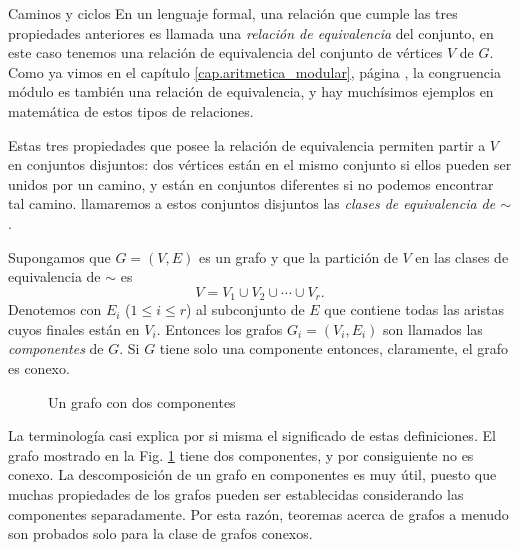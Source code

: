 \begin{section}{Caminos y ciclos}
En un lenguaje formal, una relación que  cumple las tres propiedades anteriores es llamada una  \textit{relación de equivalencia} del conjunto, en este caso tenemos una relación de equivalencia del conjunto de vértices $V$ de $G$. Como ya vimos en el capítulo \ref{cap.aritmetica_modular}, página  \pageref{relacion-de-equivalencia}, la congruencia módulo es también una relación de equivalencia, y hay muchísimos ejemplos en matemática de estos tipos de relaciones. 

Estas tres propiedades que posee la relación de equivalencia permiten partir a $V$ en conjuntos disjuntos: dos vértices están en el mismo conjunto si ellos pueden ser unidos por un camino, y están en conjuntos diferentes si no podemos encontrar tal camino. llamaremos a estos conjuntos disjuntos las \textit{clases de equivalencia de $\sim$}.

\begin{definicion}Supongamos que $G=(V,E)$ es un grafo y que la partición de $V$ en las clases de equivalencia de $\sim$ es
$$
V= V_1 \cup V_2 \cup \cdots \cup V_r.
$$
Denotemos con $E_i$ ($1\le i \le r$) al subconjunto de $E$ que contiene todas las aristas cuyos finales están en $V_i$. Entonces los grafos $G_i=(V_i,E_i)$ son llamados las \textit{componentes}     de $G$. Si $G$ tiene solo una componente entonces, claramente, el grafo es {conexo}.
\end{definicion}

\begin{figure}[t]
    \begin{center}
\end{center}
\caption{Un grafo con dos componentes} \label{f5.6}
\end{figure}

La terminología casi explica por si misma el significado de estas definiciones. El grafo mostrado en la Fig. \ref{f5.6} tiene dos componentes, y por consiguiente no es conexo. La descomposición de un grafo en componentes es muy útil, puesto que muchas propiedades de los grafos pueden ser establecidas considerando las componentes separadamente. Por esta razón, teoremas acerca de grafos a menudo son probados solo para la clase de grafos conexos.


\end{section}
